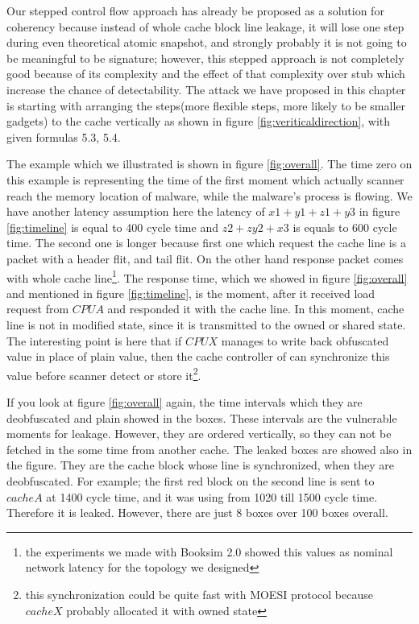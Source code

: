 	Our stepped control flow approach has already be proposed as a solution for coherency because instead of whole cache block line leakage, it will lose one step during even theoretical atomic snapshot, and strongly probably it is not going to be meaningful to be signature; however, this stepped approach is not completely good because of its complexity and the effect of that complexity over stub which increase the chance of detectability. The attack we have proposed in this chapter is starting with arranging the steps(more flexible steps, more likely to be smaller gadgets) to the cache vertically as shown in figure \ref{fig:veriticaldirection}, with given formulas 5.3, 5.4. 

	The example which we illustrated is shown in figure \ref{fig:overall}. The time zero on this example is representing the time of the first moment which actually scanner reach the memory location of malware, while the malware's process is flowing. We have another latency assumption here the latency of $x1+y1+z1+y3$ in figure \ref{fig:timeline} is equal to 400 cycle time and $z2+zy2+x3$ is equals to 600 cycle time. The second one is longer because first one which request the cache line is a packet with a header flit, and tail flit. On the other hand response packet comes with whole cache line\footnote{the experiments we made with Booksim 2.0 showed this values as nominal network latency for the topology we designed}. The response time, which we showed in figure \ref{fig:overall} and mentioned in figure \ref{fig:timeline}, is the moment, after it received load request from $CPUA$ and responded it with the cache line. In this moment, cache line is not in modified state, since it is transmitted to the owned or shared state. The interesting point is here that if $CPUX$ manages to write back obfuscated value in place of plain value, then the cache controller of can synchronize this value before scanner detect or store it\footnote{this synchronization could be quite fast with MOESI protocol because $cacheX$ probably allocated it with owned state}. 

	If you look at figure \ref{fig:overall} again, the time intervals which they are deobfuscated and plain showed in the boxes. These intervals are the vulnerable moments for leakage. However, they are ordered vertically, so they can not be fetched in the some time from another cache. The leaked boxes are showed also in the figure. They are the cache block whose line is synchronized, when they are deobfuscated. For example; the first red block on the second line is sent to $cacheA$ at 1400 cycle time, and it was using from 1020 till 1500 cycle time. Therefore it is leaked. However, there are just 8 boxes over 100 boxes overall.

